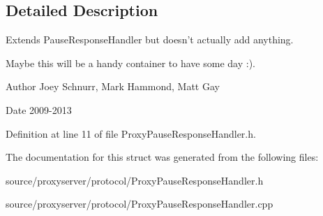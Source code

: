 \subsection{Detailed Description}
Extends Pause\-Response\-Handler but doesn't actually add anything. 

Maybe this will be a handy container to have some day \-:). \begin{DoxyAuthor}{Author}
Joey Schnurr, Mark Hammond, Matt Gay 
\end{DoxyAuthor}
\begin{DoxyDate}{Date}
2009-\/2013 
\end{DoxyDate}


Definition at line 11 of file Proxy\-Pause\-Response\-Handler.\-h.



The documentation for this struct was generated from the following files\-:\begin{DoxyCompactItemize}
\item 
source/proxyserver/protocol/Proxy\-Pause\-Response\-Handler.\-h\item 
source/proxyserver/protocol/Proxy\-Pause\-Response\-Handler.\-cpp\end{DoxyCompactItemize}
